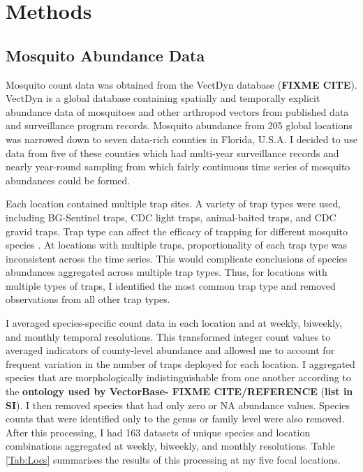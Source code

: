 \section{Methods}

\subsection{Mosquito Abundance Data}

Mosquito count data was obtained from the VectDyn database (\textbf{FIXME CITE}). VectDyn is a global database containing spatially and temporally explicit abundance data of mosquitoes and other arthropod vectors from published data and surveillance program records. Mosquito abundance from 205 global locations was narrowed down to seven data-rich counties in Florida, U.S.A. I decided to use data from five of these counties which had multi-year surveillance records and nearly year-round sampling from which fairly continuous time series of mosquito abundances could be formed. 

Each location contained multiple trap sites. A variety of trap types were used, including BG-Sentinel traps, CDC light traps, animal-baited traps, and CDC gravid traps. Trap type can affect the efficacy of trapping for different mosquito species \citep{Li2016}. At locations with multiple traps, proportionality of each trap type was inconsistent across the time series. This would complicate conclusions of species abundances aggregated across multiple trap types. Thus, for locations with multiple types of traps, I identified the most common trap type and removed observations from all other trap types. 


I averaged species-specific count data in each location and at weekly, biweekly, and monthly temporal resolutions. This transformed integer count values to averaged indicators of county-level abundance and allowed me to account for frequent variation in the number of traps deployed for each location. I aggregated species that are morphologically indistinguishable from one another according to the \textbf{ontology used by VectorBase- FIXME CITE/REFERENCE} (\textbf{list in SI}). I then removed species that had only zero or NA abundance values. Species counts that were identified only to the genus or family level were also removed. After this processing, I had 163 datasets of unique species and location combinations aggregated at weekly, biweekly, and monthly resolutions. Table \ref{Tab:Locs} summarises the results of this processing at my five focal locations.

